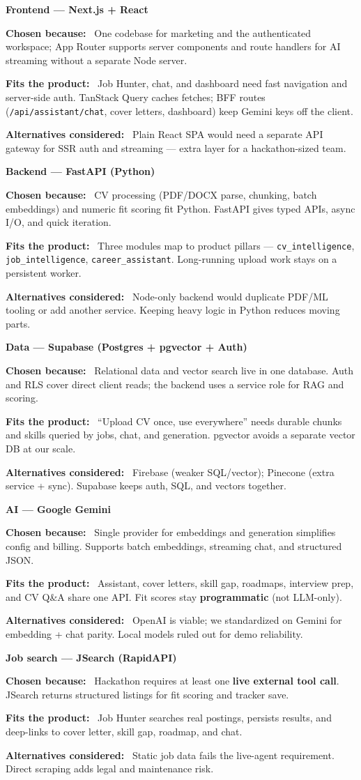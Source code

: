 \documentclass[11pt,a4paper]{article}
\newcommand{\layertitle}[1]{%
  \vspace{0.65em}%
  \noindent
  \colorbox{layertitlebg}{%
    \parbox{\dimexpr\linewidth-2\fboxsep}{%
      \vspace{4pt}%
      {\large\bfseries #1}%
      \vspace{4pt}%
    }%
  }%
  \par\vspace{0.35em}%
}
\newcommand{\justifitem}[2]{%
  \vspace{0.25em}%
  \noindent\textbf{#1}\ %
  #2\par
}
\begin{document}
\layertitle{Frontend --- Next.js + React}
\justifitem{Chosen because:}{One codebase for marketing and the authenticated workspace; App Router supports server components and route handlers for AI streaming without a separate Node server.}
\justifitem{Fits the product:}{Job Hunter, chat, and dashboard need fast navigation and server-side auth. TanStack Query caches fetches; BFF routes (\texttt{/api/assistant/chat}, cover letters, dashboard) keep Gemini keys off the client.}
\justifitem{Alternatives considered:}{Plain React SPA would need a separate API gateway for SSR auth and streaming --- extra layer for a hackathon-sized team.}

\layertitle{Backend --- FastAPI (Python)}
\justifitem{Chosen because:}{CV processing (PDF/DOCX parse, chunking, batch embeddings) and numeric fit scoring fit Python. FastAPI gives typed APIs, async I/O, and quick iteration.}
\justifitem{Fits the product:}{Three modules map to product pillars --- \texttt{cv\_intelligence}, \texttt{job\_intelligence}, \texttt{career\_assistant}. Long-running upload work stays on a persistent worker.}
\justifitem{Alternatives considered:}{Node-only backend would duplicate PDF/ML tooling or add another service. Keeping heavy logic in Python reduces moving parts.}

\layertitle{Data --- Supabase (Postgres + pgvector + Auth)}
\justifitem{Chosen because:}{Relational data and vector search live in one database. Auth and RLS cover direct client reads; the backend uses a service role for RAG and scoring.}
\justifitem{Fits the product:}{``Upload CV once, use everywhere'' needs durable chunks and skills queried by jobs, chat, and generation. pgvector avoids a separate vector DB at our scale.}
\justifitem{Alternatives considered:}{Firebase (weaker SQL/vector); Pinecone (extra service + sync). Supabase keeps auth, SQL, and vectors together.}

\layertitle{AI --- Google Gemini}
\justifitem{Chosen because:}{Single provider for embeddings and generation simplifies config and billing. Supports batch embeddings, streaming chat, and structured JSON.}
\justifitem{Fits the product:}{Assistant, cover letters, skill gap, roadmaps, interview prep, and CV Q\&A share one API. Fit scores stay \textbf{programmatic} (not LLM-only).}
\justifitem{Alternatives considered:}{OpenAI is viable; we standardized on Gemini for embedding + chat parity. Local models ruled out for demo reliability.}

\layertitle{Job search --- JSearch (RapidAPI)}
\justifitem{Chosen because:}{Hackathon requires at least one \textbf{live external tool call}. JSearch returns structured listings for fit scoring and tracker save.}
\justifitem{Fits the product:}{Job Hunter searches real postings, persists results, and deep-links to cover letter, skill gap, roadmap, and chat.}
\justifitem{Alternatives considered:}{Static job data fails the live-agent requirement. Direct scraping adds legal and maintenance risk.}
\end{document}
